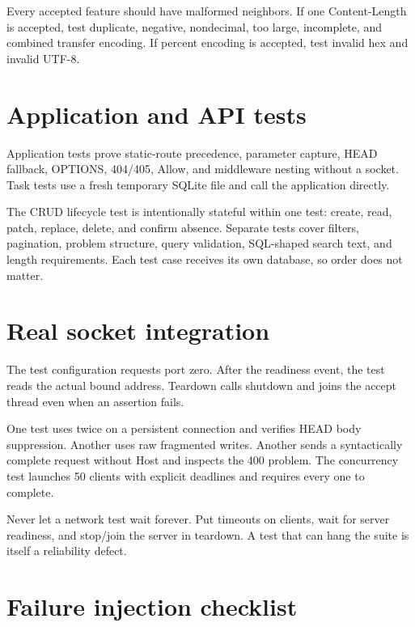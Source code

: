 Every accepted feature should have malformed neighbors. If one Content-Length
is accepted, test duplicate, negative, nondecimal, too large, incomplete, and
combined transfer encoding. If percent encoding is accepted, test invalid hex
and invalid UTF-8.

\section{Application and API tests}

Application tests prove static-route precedence, parameter capture, HEAD fallback,
OPTIONS, 404/405, Allow, and middleware nesting without a socket. Task tests use
a fresh temporary SQLite file and call the application directly.


The CRUD lifecycle test is intentionally stateful within one test: create, read,
patch, replace, delete, and confirm absence. Separate tests cover filters,
pagination, problem structure, query validation, SQL-shaped search text, and
length requirements. Each test case receives its own database, so order does not
matter.

\section{Real socket integration}


The test configuration requests port zero. After the readiness event, the test
reads the actual bound address. Teardown calls shutdown and joins the accept
thread even when an assertion fails.

One test uses  twice on a persistent connection and verifies
HEAD body suppression. Another uses raw fragmented writes. Another sends a
syntactically complete request without Host and inspects the 400 problem. The
concurrency test launches 50 clients with explicit deadlines and requires every
one to complete.

\begin{pitfall}
Never let a network test wait forever. Put timeouts on clients, wait for server
readiness, and stop/join the server in teardown. A test that can hang the suite
is itself a reliability defect.
\end{pitfall}

\section{Failure injection checklist}

